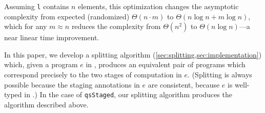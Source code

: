 \begin{abstrsyn}
Assuming \texttt{l} contains $n$ elements, this optimization changes the
asymptotic complexity from expected (randomized) $\Theta(n \cdot m)$ to
$\Theta(n\log{n} + m\log{n})$, which for any $m \approx n$ reduces the
complexity from $\Theta (n^2)$ to $\Theta(n\log{n})$---a near linear time
improvement. 

In this paper, we develop a splitting algorithm
(\ref{sec:splitting,sec:implementation}) which, given a program $e$ in \lang,
produces an equivalent pair of programs which correspond precisely to the two
stages of computation in $e$.
(Splitting is always possible because the staging annotations in $e$ are
consistent, because $e$ is well-typed in \lang.) In the case of
\texttt{qsStaged}, our splitting algorithm produces the algorithm described
above.






\end{abstrsyn}
